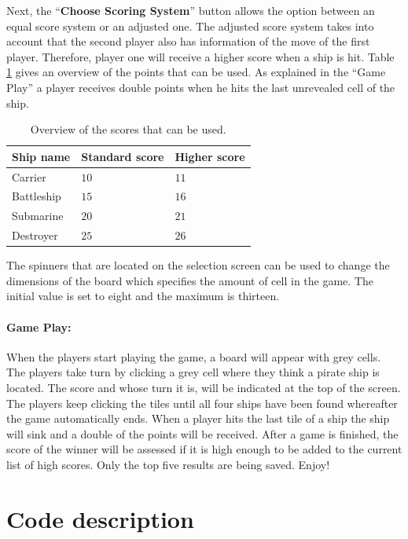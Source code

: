 \documentclass[a4paper,10pt]{article}
\begin{document}
Next, the ``\textbf{Choose Scoring System}'' button allows the option between an equal score system or an adjusted one. The adjusted score system takes into account that the second player also has information of the move of the first player. Therefore, player one will receive a higher score when a ship is hit. Table \ref{t:scores} gives an overview of the points that can be used. As explained in the ``Game Play'' a player receives double points when he hits the last unrevealed cell of the ship.

\begin{table}[h!]
	\centering
	\begin{tabular}{|p{3cm}|p{3cm}|p{3cm}|}
		\hline
		\textbf{Ship name} & \textbf{Standard score} & \textbf{Higher score}\\ \hline
		Carrier  & $ 10 $ & $ 11 $\\ \hline
		Battleship  & $ 15 $ & $ 16 $\\ \hline
		Submarine  & $ 20 $ & $ 21 $\\ \hline
		Destroyer  & $ 25 $ & $ 26 $\\ \hline
	\end{tabular}
	\caption{Overview of the scores that can be used.}
	\label{t:scores}
\end{table}

The spinners that are located on the selection screen can be used to change the dimensions of the board which specifies the amount of cell in the game. The initial value is set to eight and the maximum is thirteen.

\paragraph{Game Play:}\label{s:Gameplay}
When the players start playing the game, a board will appear with grey cells. The players take turn by clicking a grey cell where they think a pirate ship is located. The score and whose turn it is, will be indicated at the top of the screen. The players keep clicking the tiles until all four ships have been found whereafter the game automatically ends. When a player hits the last tile of a ship the ship will sink and a double of the points will be received. After a game is finished, the score of the winner will be assessed if it is high enough to be added to the current list of high scores. Only the top five results are being saved. Enjoy! 

\section{Code description}
\end{document}
